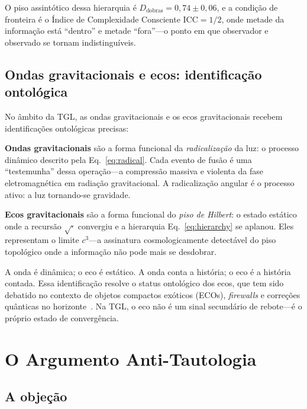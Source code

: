 \documentclass[12pt,a4paper,twocolumn]{article}
\newcommand{\Dfolds}{D_{\text{dobras}}}
\newcommand{\CCI}{\text{ICC}}
\begin{document}
O piso assintótico dessa hierarquia é $\Dfolds = 0{,}74 \pm 0{,}06$, e a condição de fronteira é o Índice de Complexidade Consciente $\CCI = 1/2$, onde metade da informação está ``dentro'' e metade ``fora''---o ponto em que observador e observado se tornam indistinguíveis.

\subsection{Ondas gravitacionais e ecos: identificação ontológica}
\label{sec:echoes}

No âmbito da TGL, as ondas gravitacionais e os ecos gravitacionais recebem identificações ontológicas precisas:

\textbf{Ondas gravitacionais} são a forma funcional da \emph{radicalização} da luz: o processo dinâmico descrito pela Eq.~\eqref{eq:radical}. Cada evento de fusão é uma ``testemunha'' dessa operação---a compressão massiva e violenta da fase eletromagnética em radiação gravitacional. A radicalização angular é o processo ativo: a luz tornando-se gravidade.

\textbf{Ecos gravitacionais} são a forma funcional do \emph{piso de Hilbert}: o estado estático onde a recursão $\sqrt{\cdot}$ convergiu e a hierarquia Eq.~\eqref{eq:hierarchy} se aplanou. Eles representam o limite $c^3$---a assinatura cosmologicamente detectável do piso topológico onde a informação não pode mais se desdobrar.

A onda é dinâmica; o eco é estático. A onda conta a história; o eco é a história contada. Essa identificação resolve o status ontológico dos ecos, que tem sido debatido no contexto de objetos compactos exóticos (ECOs), \textit{firewalls} e correções quânticas no horizonte~\cite{Cardoso2016,Abedi2017,Westerweck2018}. Na TGL, o eco não é um sinal secundário de rebote---é o próprio estado de convergência.


\section{O Argumento Anti-Tautologia}
\label{sec:anti-tautology}

\subsection{A objeção}
\end{document}
